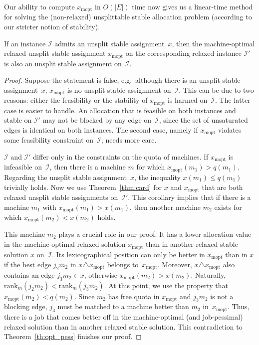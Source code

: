 \documentclass{llncs}
\begin{document}
Our ability to compute $x_{\text{mopt}}$ in $O(|E|)$ time now gives us
a linear-time method for solving the (non-relaxed) unsplittable stable
allocation problem (according to our stricter notion of stability).

\begin{lemma}
\label{le:mopt_unspl}
If an instance $\mathcal{I}$ admits an unsplit stable assignment~$x$,
then the machine-optimal relaxed unsplit stable assignment
$x_{\text{mopt}}$ on the corresponding relaxed instance $\mathcal{I}'$
is also an unsplit stable assignment on~$\mathcal{I}$.
\end{lemma}

\begin{proof}
Suppose the statement is false, e.g.\ although there is an unsplit
stable assignment~$x$, $x_{\text{mopt}}$ is no unsplit stable
assignment on~$\mathcal{I}$. This can be due to two reasons: either
the feasibility or the stability of $x_{\text{mopt}}$ is harmed
on~$\mathcal{I}$. The latter case is easier to handle. An allocation
that is feasible on both instances and stable on $\mathcal{I}'$ may
not be blocked by any edge on~$\mathcal{I}$, since the set of
unsaturated edges is identical on both instances. The second case,
namely if $x_{\text{mopt}}$ violates some feasibility constraint
on~$\mathcal{I}$, needs more care.
	
$\mathcal{I}$ and $\mathcal{I'}$ differ only in the constraints on the
quota of machines. If $x_{\text{mopt}}$ is infeasible
on~$\mathcal{I}$, then there is a machine $m$ for which
$x_{\text{mopt}}(m_1) > q(m_1)$. Regarding the unsplit stable
assignment~$x$, the inequality $x(m_1) \leq q(m_1)$ trivially
holds. Now we use Theorem~\ref{thm:card} for $x$ and $x_{\text{mopt}}$
that are both relaxed unsplit stable assignments
on~$\mathcal{I}'$. This corollary implies that if there is a machine
$m_1$ with $x_{\text{mopt}}(m_1) > x(m_1)$, then another machine $m_2$
exists for which $x_{\text{mopt}}(m_2) < x(m_2)$ holds.
	
This machine $m_2$ plays a crucial role in our proof. It has a lower
allocation value in the machine-optimal relaxed solution $x_{\text{mopt}}$
than in another relaxed stable solution $x$ on~$\mathcal{I}$. Its
lexicographical position can only be better in $x_{\text{mopt}}$ than
in $x$ if the best edge $j_2 m_2$ in $x \triangle x_{\text{mopt}}$
belongs to~$x_{\text{mopt}}$. Moreover, $x \triangle x_{\text{mopt}}$
also contains an edge $j_3 m_2 \in x$, otherwise $x_{\text{mopt}}(m_2)
> x(m_2)$. Naturally, $\text{rank}_m(j_2 m_2) < \text{rank}_m(j_3
m_2)$. At this point, we use the property that $x_{\text{mopt}}(m_2) <
q(m_2)$. Since $m_2$ has free quota in $x_{\text{mopt}}$ and $j_3 m_2$
is not a blocking edge, $j_3$ must be matched to a machine better than
$m_2$ in~$x_{\text{mopt}}$. Thus, there is a job that comes better off
in the machine-optimal (and job-pessimal) relaxed solution than in another
relaxed stable solution. This contradiction to
Theorem~\ref{th:opt_pess} finishes our proof.
\end{proof}
\end{document}
